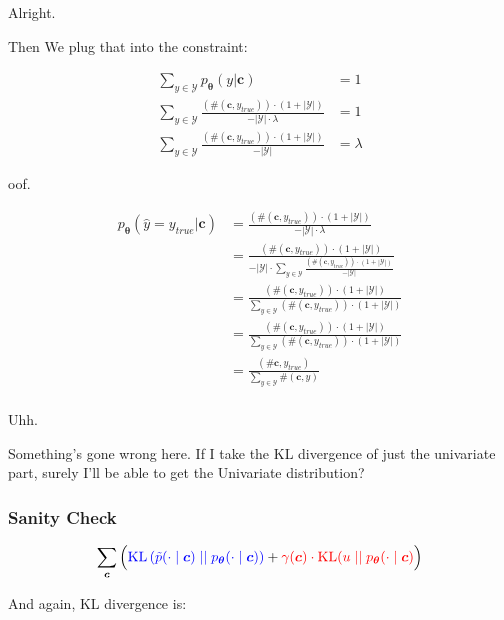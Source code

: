 \documentclass{article}
\newcommand{\KL}{\mathrm{KL}}
\newcommand{\uniform}{u}
\newcommand{\vtheta}{\boldsymbol{\theta}}
\newcommand{\model}{p_{\vtheta}}
\newcommand{\context}{\boldsymbol{c}}
\begin{document}
		Alright.
		
		Then We plug that into the constraint:
		
		\begin{align}
			\sum_{y\in\mathcal{Y}} \model(y|\context) &= 1\\
			\sum_{y\in\mathcal{Y}} \frac{(\#(\context, y_{true}))\cdot (1 + |\mathcal{Y}|)}{- |\mathcal{Y}|\cdot \lambda } &= 1\\
			\sum_{y\in\mathcal{Y}} \frac{(\#(\context, y_{true}))\cdot (1 + |\mathcal{Y}|)}{- |\mathcal{Y}| } &= \lambda
		\end{align}
		
		oof.
		
		\begin{align}
			\model(\hat{y} = y_{true}|\context) &= \frac{(\#(\context, y_{true}))\cdot (1 + |\mathcal{Y}|)}{- |\mathcal{Y}|\cdot \lambda}\\
			&= \frac{(\#(\context, y_{true}))\cdot (1 + |\mathcal{Y}|)}{- |\mathcal{Y}|\cdot \sum_{y\in\mathcal{Y}} \frac{(\#(\context, y_{true}))\cdot (1 + |\mathcal{Y}|)}{- |\mathcal{Y}| }}\\
			&= \frac{(\#(\context, y_{true}))\cdot (1 + |\mathcal{Y}|)}{\sum_{y\in\mathcal{Y}} (\#(\context, y_{true}))\cdot (1 + |\mathcal{Y}|)}\\
			&= \frac{(\#(\context, y_{true}))\cdot (1 + |\mathcal{Y}|)}{\sum_{y\in\mathcal{Y}} (\#(\context, y_{true}))\cdot (1 + |\mathcal{Y}|)}\\
			&= \frac{(\#\context, y_{true})}{\sum_{y\in\mathcal{Y}} \#(\context, y)}\\
		\end{align}
		
		Uhh.
		
		Something's gone wrong here. If I take the KL divergence of just the univariate part, surely I'll be able to get the Univariate distribution?
		
		\subsubsection{Sanity Check}
		
			\begin{align}
		  		 \sum_{\context} \Big( {\color{blue} \KL\left(\tilde{p}(\cdot 			\mid \context) \mid\mid \model(\cdot \mid \context)					\right)} + {\color{red}\gamma(\context) \cdot 						\KL(\uniform \mid\mid \model(\cdot \mid \context)}\Big)
			\end{align}
			
			And again, KL divergence is:
			
\end{document}
